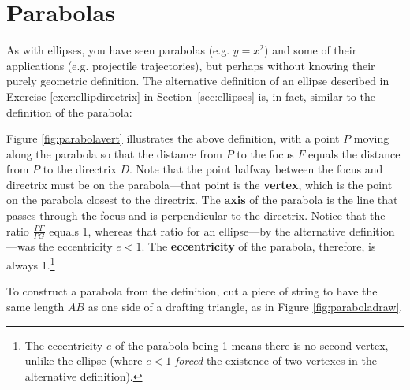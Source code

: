 \section{Parabolas}
As with ellipses, you have seen parabolas (e.g. $y=x^2$) and some of their
applications (e.g. projectile trajectories), but perhaps without knowing their
purely geometric definition. The alternative definition of an ellipse described
in Exercise \ref{exer:ellipdirectrix} in Section~\ref{sec:ellipses} is, in fact, similar to the
definition of the parabola:


Figure \ref{fig:parabolavert} illustrates the above definition, with a point $P$
moving along the parabola so that the distance from $P$ to the focus $F$ equals
the distance from $P$ to the directrix $D$. Note that the point halfway between
the focus and directrix must be on the parabola---that point is the
\textbf{vertex}, which is the point on the parabola
closest to the directrix. The \textbf{axis} of the parabola is the line that
passes through the focus and is perpendicular to the directrix. Notice that the
ratio $\frac{PF}{PG}$ equals 1, whereas that ratio for an ellipse---by the
alternative definition---was the eccentricity $e<1$. The
\textbf{eccentricity} of the parabola, therefore,
is always 1.\footnote{The eccentricity $e$ of the parabola being 1 means there
is no second vertex, unlike the ellipse (where $e<1$ \emph{forced} the existence
of two vertexes in the alternative definition).}

To construct a parabola from the definition, cut a piece of string to have the
same length $AB$ as one side of a drafting triangle, as in Figure
\ref{fig:paraboladraw}.


